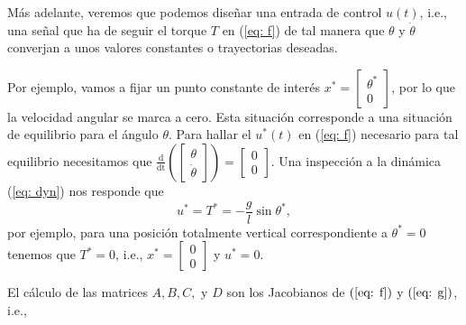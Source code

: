 \begin{example}
Más adelante, veremos que podemos diseñar una entrada de control $u(t)$, i.e., una señal que ha de seguir el torque $T$ en (\ref{eq: f}) de tal manera que $\theta$ y $\dot\theta$ converjan a unos valores constantes o trayectorias deseadas.

Por ejemplo, vamos a fijar un punto constante de interés $x^* = \begin{bmatrix}\theta^* \\ 0\end{bmatrix}$, por lo que la velocidad angular se marca a cero. Esta situación corresponde a una situación de equilibrio para el ángulo $\theta$. Para hallar el $u^*(t)$ en (\ref{eq: f}) necesario para tal equilibrio necesitamos que $\frac{\mathrm{d}}{\mathrm{dt}}\left(\begin{bmatrix}\theta \\ \dot\theta \end{bmatrix}\right) = \begin{bmatrix}0 \\ 0 \end{bmatrix}$. Una inspección a la dinámica (\ref{eq: dyn}) nos responde que
\begin{equation}
	u^* = T^* = -\frac{g}{l}\sin\theta^*,
\end{equation}
por ejemplo, para una posición totalmente vertical correspondiente a $\theta^* = 0$ tenemos que $T^*=0$, i.e., $x^* = \begin{bmatrix}0\\0\end{bmatrix}$ y $u^* = 0$.

El cálculo de las matrices $A,B,C,$ y $D$ son los Jacobianos de $(\ref{eq: f})$ y $(\ref{eq: g})$, i.e.,


\end{example}
